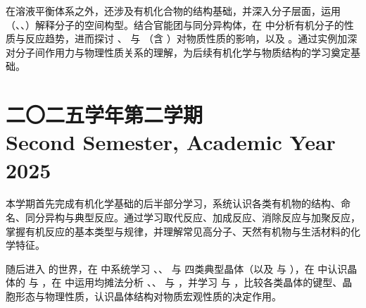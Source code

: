 \documentclass[twoside,12pt,openright]{book}
\begin{document}
    在溶液平衡体系之外，还涉及有机化合物的结构基础，并深入分子层面，运用 （、、）解释分子的空间构型。结合官能团与同分异构体，在  中分析有机分子的性质与反应趋势，进而探讨 、 与 （含 ）对物质性质的影响，以及 。通过实例加深对分子间作用力与物理性质关系的理解，为后续有机化学与物质结构的学习奠定基础。

    \cleardoublepage
    

    \cleardoublepage
    \part{\texorpdfstring{二〇二五学年第二学期 \\Second Semester, Academic Year 2025}{二〇二五学年第二学期 Second Semester, Academic Year 2025}}

    本学期首先完成有机化学基础的后半部分学习，系统认识各类有机物的结构、命名、同分异构与典型反应。通过学习取代反应、加成反应、消除反应与加聚反应，掌握有机反应的基本类型与规律，并理解常见高分子、天然有机物与生活材料的化学特征。
    
    随后进入  的世界，在  中系统学习 、、 与  四类典型晶体（以及  与 ），在  中认识晶体的  与 ，在  中运用均摊法分析 、、 与 ，并学习  与 ，比较各类晶体的键型、晶胞形态与物理性质，认识晶体结构对物质宏观性质的决定作用。
    
\end{document}
